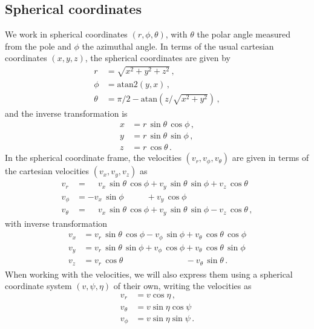 \subsection{Spherical coordinates}

We work in spherical coordinates $(r,\phi,\theta)$, with $\theta$ the polar angle measured from the pole and $\phi$ the azimuthal angle. In terms of the usual cartesian coordinates $(x,y,z)$, the spherical coordinates are given by
\begin{align}
    \nonumber r       &= \sqrt{x^2 + y^2 + z^2}\,,\\
    \phi    &= \mathrm{atan2}(y,x)\,,\\
    \nonumber \theta  &= \pi/2 - \mathrm{atan}(z/\sqrt{x^2+y^2})\,,
\end{align}
and the inverse transformation is
\begin{align}
    \nonumber x  &= r\,\sin \theta\, \cos \phi\,,\\
    y  &= r\,\sin \theta\, \sin \phi\,,\label{eq-sphere-coords}\\
    \nonumber z  &= r\,\cos \theta\,.
\end{align}
In the spherical coordinate frame, the velocities  $(v_r,v_\phi,v_\theta)$ are given in terms of the cartesian velocities $(v_x,v_y,v_z)$ as
\begin{align}
    \nonumber v_r & = \phantom{-}v_x\,\sin\theta\,\cos\phi+v_y\,\sin\theta\,\sin\phi+v_z\,\cos\theta\\
    v_\phi & = -v_x\,\sin\phi\phantom{\,\cos\phi}+v_y\,\cos\phi\\
    \nonumber v_\theta & = \phantom{-}v_x\,\sin\theta\,\cos\phi+v_y\,\sin\theta\,\sin\phi-v_z\,\cos\theta\,,
\end{align}
with inverse transformation
\begin{align}
    \nonumber v_x & = v_r\,\sin\theta\,\cos\phi-v_\phi\,\sin \phi+v_\theta\,\cos\theta\,\cos\phi\\
    v_y & = v_r\,\sin\theta\,\sin\phi+v_\phi\,\cos\phi+v_\theta\,\cos\theta\,\sin \phi\label{eq-vel-spher}\\
    \nonumber v_z & = v_r\,\cos\theta\phantom{\,\sin\phi+v_\phi\,\cos\phi}-v_\theta\,\sin\theta\,.
\end{align}
When working with the velocities, we will also express them using a spherical coordinate system $(v,\psi,\eta)$ of their own, writing the velocities as
\begin{align}
    \nonumber v_{r} & = v \cos\eta\,, \\
     v_{\theta} & = v \sin \eta \cos \psi \label{eq-sphervels}\\
    \nonumber v_{\phi} & = v \sin \eta \sin \psi\,.
\end{align}
